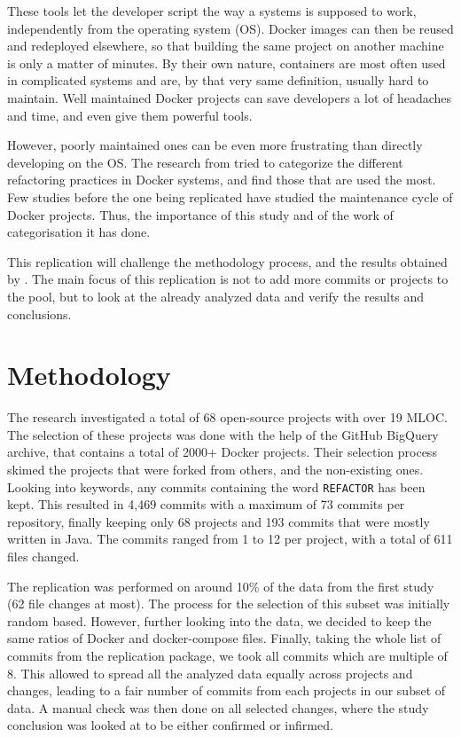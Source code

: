 \documentclass[lettersize,journal]{IEEEtran}
\begin{document}
These tools let the developer script the way a systems is supposed to work, independently from the operating system (OS).
Docker images can then be reused and redeployed elsewhere, so that building the same project on another machine is only a matter of minutes.
By their own nature, containers are most often used in complicated systems and are, by that very same definition, usually hard to maintain.
Well maintained Docker projects can save developers a lot of headaches and time, and even give them powerful tools.

However, poorly maintained ones can be even more frustrating than directly developing on the OS.
The research from \cite{ksontini_refactorings_2021} tried to categorize the different refactoring practices in Docker systems, and find those that are used the most.
Few studies before the one being replicated have studied the maintenance cycle of Docker projects.
Thus, the importance of this study and of the work of categorisation it has done.

This replication will challenge the methodology process, and the results \cite{noauthor_ase21_nodate} obtained by \cite{ksontini_refactorings_2021}.
The main focus of this replication is not to add more commits or projects to the pool, but to look at the already analyzed data and verify the results and conclusions.

\section{Methodology}\label{sec:methodology}

The research \cite{ksontini_refactorings_2021} investigated a total of 68 open-source projects with over 19 MLOC.
The selection of these projects was done with the help of the GitHub BigQuery archive, that contains a total of 2000+ Docker projects.
Their selection process skimed the projects that were forked from others, and the non-existing ones.
Looking into keywords, any commits containing the word \texttt{REFACTOR} has been kept.
This resulted in 4,469 commits with a maximum of 73 commits per repository, finally keeping only 68 projects and 193 commits that were mostly written in Java.
The commits ranged from 1 to 12 per project, with a total of 611 files changed.

The replication was performed on around 10\% of the data from the first study (62 file changes at most).
The process for the selection of this subset was initially random based.
However, further looking into the data, we decided to keep the same ratios of Docker and docker-compose files.
Finally, taking the whole list of commits from the replication package, we took all commits which are multiple of 8.
This allowed to spread all the analyzed data equally across projects and changes, leading to a fair number of commits from each projects in our subset of data.
A manual check was then done on all selected changes, where the study conclusion was looked at to be either confirmed or infirmed.
\end{document}

